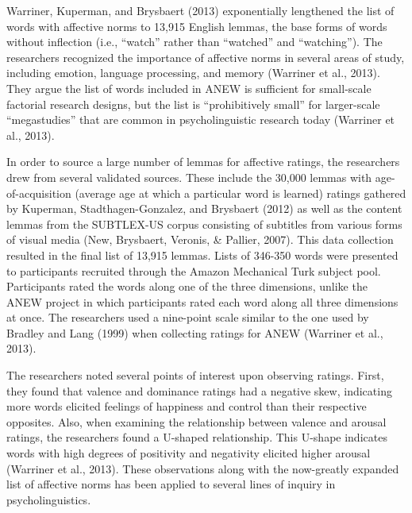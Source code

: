 \documentclass[english,,man]{apa6}
\begin{document}
Warriner, Kuperman, and Brysbaert (2013) exponentially lengthened the list of words with affective norms to 13,915 English lemmas, the base forms of words without inflection (i.e., \enquote{watch} rather than \enquote{watched} and \enquote{watching}). The researchers recognized the importance of affective norms in several areas of study, including emotion, language processing, and memory (Warriner et al., 2013). They argue the list of words included in ANEW is sufficient for small-scale factorial research designs, but the list is \enquote{prohibitively small} for larger-scale \enquote{megastudies} that are common in psycholinguistic research today (Warriner et al., 2013).

In order to source a large number of lemmas for affective ratings, the researchers drew from several validated sources. These include the 30,000 lemmas with age-of-acquisition (average age at which a particular word is learned) ratings gathered by Kuperman, Stadthagen-Gonzalez, and Brysbaert (2012) as well as the content lemmas from the SUBTLEX-US corpus consisting of subtitles from various forms of visual media (New, Brysbaert, Veronis, \& Pallier, 2007). This data collection resulted in the final list of 13,915 lemmas. Lists of 346-350 words were presented to participants recruited through the Amazon Mechanical Turk subject pool. Participants rated the words along one of the three dimensions, unlike the ANEW project in which participants rated each word along all three dimensions at once. The researchers used a nine-point scale similar to the one used by Bradley and Lang (1999) when collecting ratings for ANEW (Warriner et al., 2013).

The researchers noted several points of interest upon observing ratings. First, they found that valence and dominance ratings had a negative skew, indicating more words elicited feelings of happiness and control than their respective opposites. Also, when examining the relationship between valence and arousal ratings, the researchers found a U-shaped relationship. This U-shape indicates words with high degrees of positivity and negativity elicited higher arousal (Warriner et al., 2013). These observations along with the now-greatly expanded list of affective norms has been applied to several lines of inquiry in psycholinguistics.
\end{document}
